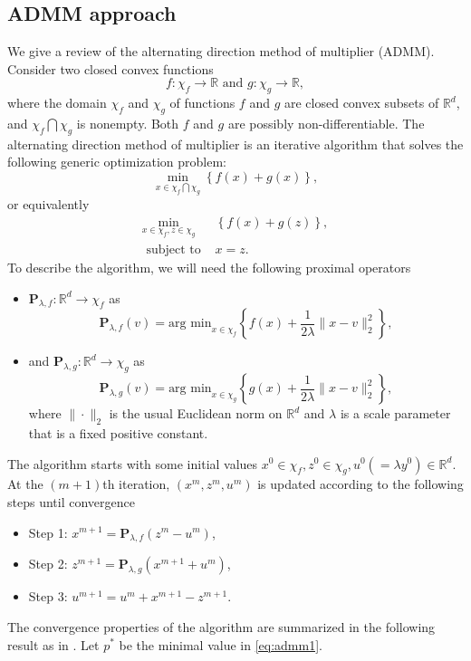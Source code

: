 \documentclass[AMS,STIX1COL]{WileyNJD-v2}
\begin{document}
{\subsection{ADMM approach}
\label{sec:ADMM}
We give a review of the alternating direction method
of multiplier (ADMM).
Consider two closed convex functions
$$
f : \chi_f \to \mathbb{R} \mbox{ and } g : \chi_g \to \mathbb{R},
$$
where the domain $\chi_f$ and $\chi_g$ of functions $f$ and $g$ are closed convex subsets of $\mathbb{R}^d$, and $\chi_f \bigcap \chi_g$ is nonempty.
Both $f$ and $g$ are possibly non-differentiable.
The alternating direction method
of multiplier is an iterative algorithm that solves the following generic optimization problem:
$$
\min_{x \in \chi_f \bigcap \chi_g} \left\{f(x) + g(x) \right\},
$$
or equivalently
\begin{eqnarray}
\label{eq:admm1}
\min_{x \in \chi_f, z\in \chi_g} & \left\{f(x) + g(z) \right\}, \\
\mbox{ subject to } & x = z. \nonumber
\end{eqnarray}
To describe the algorithm, we will need the following proximal operators
\begin{itemize}
\item $\mathbf{P}_{\lambda,f}: \mathbb{R}^d \to \chi_f$ as
$$
\mathbf{P}_{\lambda,f}(v) = \mbox{arg min}_{x \in \chi_f} \left\{
f(x) + \frac{1}{2\lambda} \|x-v\|^2_2
\right\},
$$

\item and $\mathbf{P}_{\lambda,g}: \mathbb{R}^d \to \chi_g$ as
$$
\mathbf{P}_{\lambda,g}(v) = \mbox{arg min}_{x \in \chi_g} \left\{
g(x) + \frac{1}{2\lambda} \|x-v\|^2_2
\right\},
$$
where $\|\cdot\|_2$ is the usual Euclidean norm on $\mathbb{R}^d$ and $\lambda$ is a scale parameter that is a fixed positive constant.
\end{itemize}
The algorithm starts with some initial values $x^0 \in \chi_f,
z^0 \in \chi_g, u^0 (=\lambda y^0) \in \mathbb{R}^d$.
At the $(m+1)$th iteration, $(x^m, z^m, u^m)$ is updated according to the following steps until convergence
\begin{itemize}
\item Step 1: $x^{m+1} = \mathbf{P}_{\lambda,f}(z^m - u^m)$,

\item Step 2: $z^{m+1} = \mathbf{P}_{\lambda,g}(x^{m+1} + u^m)$,

\item Step 3: $u^{m+1} = u^m + x^{m+1} - z^{m+1}$.

\end{itemize}
The convergence properties of the algorithm are summarized in the following result as in \cite{boyd2011distributed}.
Let $p^\ast$ be the minimal value in \eqref{eq:admm1}.

}
\end{document}
